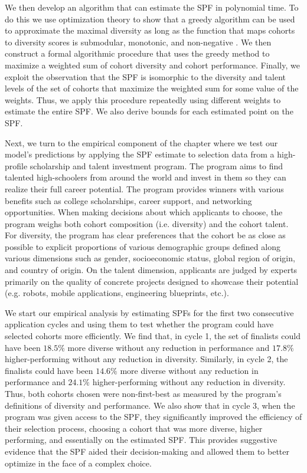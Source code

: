 We then develop an algorithm that can estimate the SPF in polynomial time. To do this we use optimization theory to show that a greedy algorithm can be used to approximate the maximal diversity as long as the function that maps cohorts to diversity scores is submodular, monotonic, and non-negative \cite{krause2014submodular, huppenkothen2020entrofy}. We then construct a formal algorithmic procedure that uses the greedy method to maximize a weighted sum of cohort diversity and cohort performance. Finally, we exploit the observation that the SPF is isomorphic to the diversity and talent levels of the set of cohorts that maximize the weighted sum for some value of the weights. Thus, we apply this procedure repeatedly using different weights to estimate the entire SPF. We also derive bounds for each estimated point on the SPF. 

Next, we turn to the empirical component of the chapter where we test our model's predictions by applying the SPF estimate to selection data from a high-profile scholarship and talent investment program. The program aims to find talented high-schoolers from around the world and invest in them so they can realize their full career potential. The program provides winners with various benefits such as college scholarships, career support, and networking opportunities. When making decisions about which applicants to choose, the program weighs both cohort composition (i.e. diversity) and the cohort talent. For diversity, the program has clear preferences that the cohort be as close as possible to explicit proportions of various demographic groups defined along various dimensions such as gender, socioeconomic status, global region of origin, and country of origin. On the talent dimension, applicants are judged by experts primarily on the quality of concrete projects designed to showcase their potential (e.g. robots, mobile applications, engineering blueprints, etc.).

We start our empirical analysis by estimating SPFs for the first two consecutive application cycles and using them to test whether the program could have selected cohorts more efficiently. We find that, in cycle 1, the set of finalists could have been $18.5\%$ more diverse without any reduction in performance and $17.8\%$ higher-performing without any reduction in diversity. Similarly, in cycle 2, the finalists could have been $14.6\%$ more diverse without any reduction in performance and $24.1\%$ higher-performing without any reduction in diversity. Thus, both cohorts chosen were non-first-best as measured by the program's definitions of diversity and performance. We also show that in cycle 3, when the program was given access to the SPF, they significantly improved the efficiency of their selection process, choosing a cohort that was more diverse, higher performing, and essentially on the estimated SPF. This provides suggestive evidence that the SPF aided their decision-making and allowed them to better optimize in the face of a complex choice.


